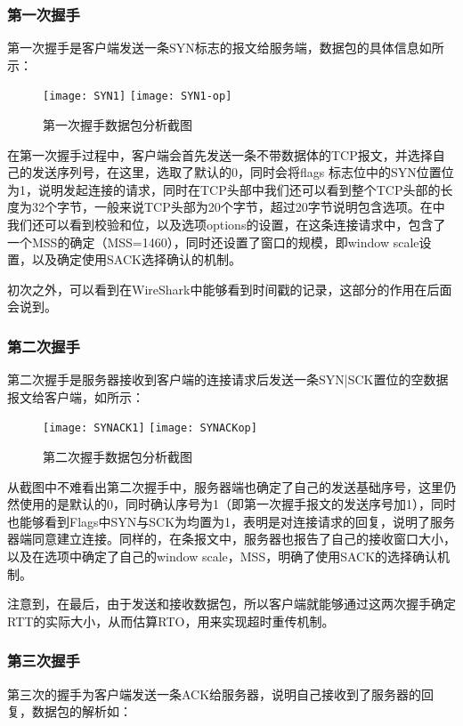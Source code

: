 \documentclass[lang=cn,11pt]{elegantpaper}
\begin{document}
\subsubsection{第一次握手}
第一次握手是客户端发送一条SYN标志的报文给服务端，数据包的具体信息如所示：


\begin{figure}[htbp]
		\centering
		\texttt{[image: SYN1]}
		\centering
		\texttt{[image: SYN1-op]}
		\caption{第一次握手数据包分析截图 \label{fig:5}}
\end{figure}


在第一次握手过程中，客户端会首先发送一条不带数据体的TCP报文，并选择自己的发送序列号，在这里，选取了默认的0，同时会将flags 标志位中的SYN位置位为1，说明发起连接的请求，同时在TCP头部中我们还可以看到整个TCP头部的长度为32个字节，一般来说TCP头部为20个字节，超过20字节说明包含选项。在中我们还可以看到校验和位，以及选项options的设置，在这条连接请求中，包含了一个MSS的确定（MSS=1460），同时还设置了窗口的规模，即window scale设置，以及确定使用SACK选择确认的机制。

初次之外，可以看到在WireShark中能够看到时间戳的记录，这部分的作用在后面会说到。
\subsubsection{第二次握手}
第二次握手是服务器接收到客户端的连接请求后发送一条SYN|SCK置位的空数据报文给客户端，如所示：

\begin{figure}[htbp]
	\centering
	\texttt{[image: SYNACK1]}
	\centering
	\texttt{[image: SYNACKop]}
	\caption{第二次握手数据包分析截图 \label{fig:6}}
\end{figure}

从截图中不难看出第二次握手中，服务器端也确定了自己的发送基础序号，这里仍然使用的是默认的0，同时确认序号为1（即第一次握手报文的发送序号加1），同时也能够看到Flags中SYN与SCK为均置为1，表明是对连接请求的回复，说明了服务器端同意建立连接。同样的，在条报文中，服务器也报告了自己的接收窗口大小，以及在选项中确定了自己的window scale，MSS，明确了使用SACK的选择确认机制。


注意到，在最后，由于发送和接收数据包，所以客户端就能够通过这两次握手确定RTT的实际大小，从而估算RTO，用来实现超时重传机制。

\subsubsection{第三次握手}
第三次的握手为客户端发送一条ACK给服务器，说明自己接收到了服务器的回复，数据包的解析如：
\end{document}

